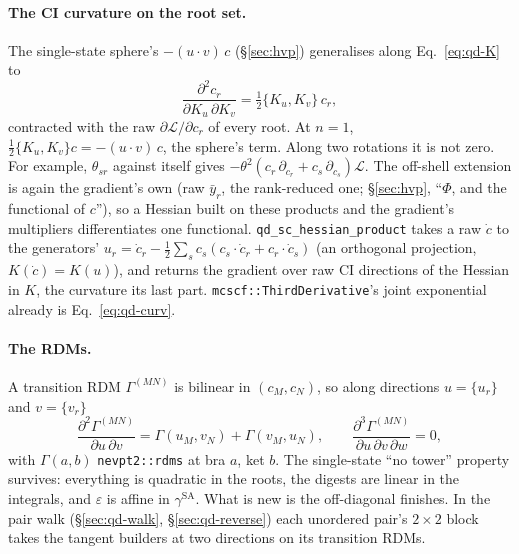 \documentclass[11pt]{article}
\newcommand{\code}[1]{\texttt{#1}}
\newcommand{\Lag}{\mathcal L}
\newcommand{\eps}{\varepsilon}
\begin{document}
\paragraph{The CI curvature on the root set.} The single-state sphere's
$-(u\cdot v)\,c$ (\S\ref{sec:hvp}) generalises along Eq.~\eqref{eq:qd-K} to
\begin{equation}
  \frac{\partial^2 c_r}{\partial K_u\,\partial K_v} = \tfrac12\{K_u, K_v\}\,c_r,
  \label{eq:qd-curv}
\end{equation}
contracted with the raw $\partial\Lag/\partial c_r$ of every root. At
$n = 1$, $\tfrac12\{K_u,K_v\}c = -(u\cdot v)\,c$, the sphere's term.
Along two rotations it is not zero. For example, $\theta_{sr}$ against
itself gives $-\theta^2(c_r\,\partial_{c_r} + c_s\,\partial_{c_s})\Lag$.
The off-shell extension is again the gradient's own (raw $\bar y_r$, the
rank-reduced one; \S\ref{sec:hvp}, ``$\Phi$, and the functional of $c$''),
so a Hessian built on these products and the gradient's multipliers
differentiates one functional. \code{qd\_sc\_hessian\_product} takes a raw
$\dot c$ to the generators' $u_r = \dot c_r - \tfrac12\sum_s
c_s(c_s\cdot\dot c_r + c_r\cdot\dot c_s)$ (an orthogonal projection, $K(\dot
c) = K(u)$), and returns the gradient over raw CI directions of the Hessian
in $K$, the curvature its last part. \code{mcscf::ThirdDerivative}'s joint
exponential already is Eq.~\eqref{eq:qd-curv}.

\paragraph{The RDMs.} A transition RDM $\Gamma^{(MN)}$ is bilinear in
$(c_M, c_N)$, so along directions $u = \{u_r\}$ and $v = \{v_r\}$
\begin{equation}
  \frac{\partial^2\Gamma^{(MN)}}{\partial u\,\partial v} = \Gamma(u_M, v_N) + \Gamma(v_M, u_N),
  \qquad \frac{\partial^3\Gamma^{(MN)}}{\partial u\,\partial v\,\partial w} = 0,
  \label{eq:qd-rdm2}
\end{equation}
with $\Gamma(a, b)$ \code{nevpt2::rdms} at bra $a$, ket $b$. The single-state
``no tower'' property survives: everything is quadratic in the roots, the
digests are linear in the integrals, and $\eps$ is affine in
$\gamma^{\mathrm{SA}}$. What is new is the off-diagonal finishes. In the
pair walk (\S\ref{sec:qd-walk}, \S\ref{sec:qd-reverse}) each unordered
pair's $2\times2$ block takes the tangent builders at two directions on its
transition RDMs.
\end{document}
